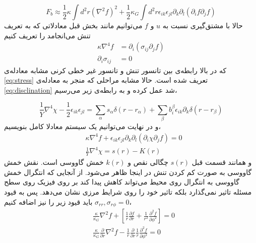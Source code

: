 \begin{equation}
F_b\approx\frac{1}{2}\kappa\int d^2r(\nabla^2 f)^2+\frac{1}{2}\kappa_G\int d^2r\epsilon_{ik}\epsilon_{jl}\partial_k\partial_l(\partial_if\partial_jf)
\end{equation}
حالا با مشتق‌گیری نسبت به $u$ و $f$
می‌توانیم مانند بخش قبل معادلاتی که به تعریف تنش می‌انجامد را تعریف کنیم
\begin{equation}
\begin{aligned}
\kappa\nabla^4f&=\partial_i(\sigma_{ij}\partial_jf)\\
\partial_i\sigma_{ij}&=0
\end{aligned}
\end{equation}
که در بالا رابطه‌ی بین تانسور تنش و تانسور غیر خطی کرنی مشابه معادله‌ی 
\ref{eq:stress}
تعریف شده است. حالا مشابه مراحلی که منجر به معادله‌ی 
\ref{eq:disclination}
شد عمل کرده و به رابطه‌ی زیر می‌رسیم،

\begin{equation}
\frac{1}{Y}\nabla^4\chi-\frac{1}{2}\epsilon_{ik}\epsilon_{jl}=\sum_\alpha s_\alpha\delta(r-r_\alpha)+\sum_\beta b_i^\beta\epsilon_{ik}\partial_k\delta(r-r_\beta)
\end{equation}
و در نهایت می‌توانیم یک سیستم معادلا کامل بنویسیم،
\begin{equation}
\begin{aligned}
&\kappa\nabla^4f+\epsilon_{ik}\epsilon_{jl}\partial_k\partial_l(\partial_i\chi\partial_jf)=0\\
&\frac{1}{Y}\nabla^4\chi=s(r)-K(r)
\end{aligned}
\end{equation}
و همانند قسمت قبل $s(r)$ چگالی نقص و 
$k(r)$
خمش گاووسی است. نقش خمش گاووسی به صورت کم کردن تنش در اینجا ظاهر می‌شود. از آنجایی که انتگرال خمش گاووسی به انتگرال روی محیط می‌تواند کاهش پیدا کند بر روی فیزیک روی سطح مسئله تاثیر نمی‌گذارد بلکه تاثیر خود را روی شرایط مرزی نشان می‌دهد. پس به قیود 
$\sigma_{rr},\sigma_{r\phi}=0$
باید قیود زیر را نیز اضافه کنیم،
\begin{equation}
\begin{aligned}
&\frac{\kappa}{\kappa_G}\nabla^2f+\left[\frac{1}{r}\frac{\partial f}{\partial r}+\frac{1}{r^2}\frac{\partial^2 f}{\partial\phi^2}\right]=0\\
&\frac{\kappa}{\kappa_G}\frac{\partial}{\partial r}\nabla^2f-\frac{1}{r}\frac{\partial}{\partial r}\frac{1}{r}\frac{\partial^2 f}{\partial\phi^2}=0
\end{aligned}
\end{equation}



















